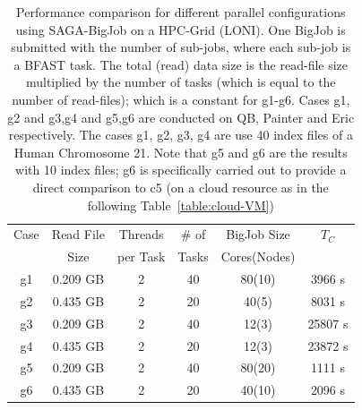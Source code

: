 \documentclass{sig-alternate}
\begin{document}
 \begin{table}
 \small
 \begin{tabular}{|c|c|c|c|c|c|} 
 \hline 
Case & Read File & Threads   &  \# of & BigJob Size   &   $T_C$   \\
   & Size& per Task & Tasks  & Cores(Nodes)  & \\
   \hline
g1 & 0.209 GB & 2 &   40 &  80(10) & 3966 s \\
g2 & 0.435 GB & 2 &  20 & 40(5) & 8031 s\\ \hline
g3  & 0.209 GB& 2 & 40  & 12(3) & 25807 s \\
g4 & 0.435 GB& 2 & 20  & 12(3) & 23872 s  \\ \hline
\hline
g5 & 0.209 GB& 2& 40 & 80(20) & 1111 s \\
g6&0.435 GB&2& 20 & 40(10)&2096 s\\
\hline
\end{tabular}
\caption{Performance comparison for different parallel configurations
  using SAGA-BigJob on a HPC-Grid (LONI). One BigJob is submitted with
  the number of sub-jobs, where each sub-job is a BFAST task.  The
  total (read) data size is the read-file size multiplied by the
  number of tasks (which is equal to the number of read-files); which
  is a constant for g1-g6.  Cases g1, g2 and g3,g4 and g5,g6 are
  conducted on QB, Painter and Eric respectively. The cases g1, g2,
  g3, g4 are use 40 index files of a Human Chromosome 21.  Note that
  g5 and g6 are the results with 10 index files; g6 is specifically
  carried out to provide a direct comparison to c5 (on a cloud
  resource as in the following Table~\ref{table:cloud-VM}) }
  
  \label{table:bigjob-loni} 
\end{table}

\end{document}
